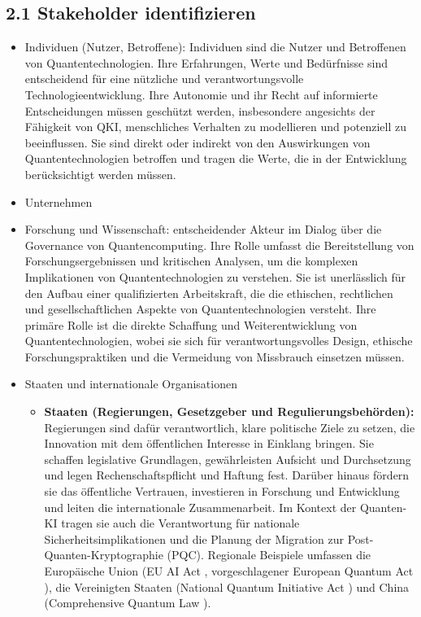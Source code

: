 \subsection{2.1 Stakeholder identifizieren}
\begin{itemize}
    \item Individuen (Nutzer, Betroffene): Individuen sind die Nutzer und Betroffenen von Quantentechnologien. Ihre Erfahrungen, Werte und Bedürfnisse sind entscheidend für eine nützliche und verantwortungsvolle Technologieentwicklung. Ihre Autonomie und ihr Recht auf informierte Entscheidungen müssen geschützt werden, insbesondere angesichts der Fähigkeit von QKI, menschliches Verhalten zu modellieren und potenziell zu beeinflussen. Sie sind direkt oder indirekt von den Auswirkungen von Quantentechnologien betroffen und tragen die Werte, die in der Entwicklung berücksichtigt werden müssen.
    \item Unternehmen
    \item Forschung und Wissenschaft: entscheidender Akteur im Dialog über die Governance von Quantencomputing. Ihre Rolle umfasst die Bereitstellung von Forschungsergebnissen und kritischen Analysen, um die komplexen Implikationen von Quantentechnologien zu verstehen. Sie ist unerlässlich für den Aufbau einer qualifizierten Arbeitskraft, die die ethischen, rechtlichen und gesellschaftlichen Aspekte von Quantentechnologien versteht. Ihre primäre Rolle ist die direkte Schaffung und Weiterentwicklung von Quantentechnologien, wobei sie sich für verantwortungsvolles Design, ethische Forschungspraktiken und die Vermeidung von Missbrauch einsetzen müssen.
    \item Staaten und internationale Organisationen
    \begin{itemize}
    \item \textbf{Staaten (Regierungen, Gesetzgeber und Regulierungsbehörden):} Regierungen sind dafür verantwortlich, klare politische Ziele zu setzen, die Innovation mit dem öffentlichen Interesse in Einklang bringen. Sie schaffen legislative Grundlagen, gewährleisten Aufsicht und Durchsetzung und legen Rechenschaftspflicht und Haftung fest. Darüber hinaus fördern sie das öffentliche Vertrauen, investieren in Forschung und Entwicklung und leiten die internationale Zusammenarbeit. Im Kontext der Quanten-KI tragen sie auch die Verantwortung für nationale Sicherheitsimplikationen und die Planung der Migration zur Post-Quanten-Kryptographie (PQC). Regionale Beispiele umfassen die Europäische Union (EU AI Act , vorgeschlagener European Quantum Act ), die Vereinigten Staaten (National Quantum Initiative Act ) und China (Comprehensive Quantum Law ). 

\end{itemize}
\end{itemize}
